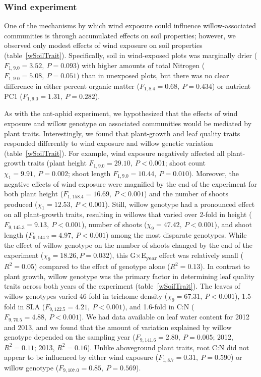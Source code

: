 \documentclass[11pt]{article}
\begin{document}
\subsubsection*{Wind experiment}

One of the mechanisms by which wind exposure could influence
willow-associated communities is through accumulated effects on soil
properties; however, we observed only modest effects of wind exposure on
soil properties (table~\ref{wSoilTrait}). Specifically, soil in wind-exposed plots was
marginally drier (\(F_{1,9.0}=3.52,\ P=0.093\)) with higher amounts of total
Nitrogen (\(F_{1,9.0}=5.08,\ P=0.051\)) than in unexposed plots, but there was no
clear difference in either percent organic matter (\(F_{1,8.4}=0.68,\ P=0.434\)) or
nutrient PC1 (\(F_{1,9.0}=1.31,\ P=0.282\)).

As with the ant-aphid experiment, we hypothesized that the effects of
wind exposure and willow genotype on associated communities would be
mediated by plant traits. Interestingly, we found that plant-growth and
leaf quality traits responded differently to wind exposure and willow
genetic variation (table~\ref{wSoilTrait}). For example, wind exposure negatively
affected all plant-growth traits (plant height \(F_{1,9.0}=29.10,\ P<0.001\); shoot
count \(\chi_1=9.91,\ P=0.002\); shoot length \(F_{1,9.0}=10.44,\ P=0.010\)). Moreover, the
negative effects of wind exposure were magnified by the end of the
experiment for both plant height (\(F_{1,158.4}=16.69,\ P<0.001\)) and the number of
shoots produced (\(\chi_1=12.53,\ P<0.001\)). Still, willow genotype had a
pronounced effect on all plant-growth traits, resulting in willows that
varied over 2-fold in height (\(F_{9,145.3}=9.13,\ P<0.001\)), number of shoots
(\(\chi_9=47.42,\ P<0.001\)), and shoot length (\(F_{9,144.2}=4.97,\ P<0.001\)) among the most
disparate genotypes. While the effect of willow genotype on the number
of shoots changed by the end of the experiment (\(\chi_9=18.26, P = 0.032\)),
this G$\times$E\textsubscript{year} effect was relatively small (\(R^2=0.05\))
compared to the effect of genotype alone (\(R^2=0.13\)). In
contrast to plant growth, willow genotype was the primary factor
in determining leaf quality traits across both years of the experiment (table~\ref{wSoilTrait}). The leaves of willow genotypes varied 46-fold in trichome density
(\(\chi_9=67.31,\ P<0.001\)), 1.5-fold in SLA (\(F_{9,122.5}=4.21,\ P<0.001\)), and 1.6-fold
in C:N (\(F_{9,70.5}=4.88,\ P<0.001\)). We had data available on leaf water content
for 2012 and 2013, and we found that the amount of variation explained
by willow genotype depended on the sampling year (\(F_{9,141.6}=2.80,\ P=0.005\);
2012, \(R^2=0.11\); 2013, \(R^2=0.16\)). Unlike aboveground
plant traits, root C:N did not appear to be influenced by either wind
exposure (\(F_{1,8.7}=0.31,\ P=0.590\)) or willow genotype (\(F_{9,107.0}=0.85,\ P=0.569\)).
\end{document}
